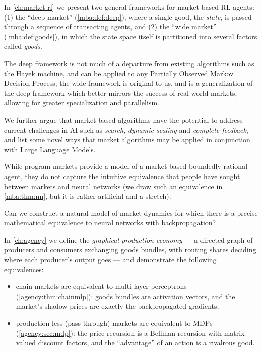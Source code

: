 \begin{contribution}
In \cref{ch:market-rl} we present two general frameworks for market-based RL agents: (1) the ``deep market'' (\cref{mba:def:deep}), where a single good, the \emph{state}, is passed through a sequence of transacting agents, and (2) the ``wide market'' (\cref{mba:def:goods}), in which the state space itself is partitioned into several factors called \emph{goods}. 

The deep framework is not much of a departure from existing algorithms such as the Hayek machine, and can be applied to any Partially Observed Markov Decision Process; the wide framework is original to us, and is a generalization of the deep framework which better mirrors the success of real-world markets, allowing for greater specialization and parallelism.

We further argue that market-based algorithms have the potential to address current challenges in AI such as \emph{search}, \emph{dynamic scaling} and \emph{complete feedback}, and list some novel ways that market algorithms may be applied in conjunction with Large Language Models.
\end{contribution}

While program markets provide a model of a market-based boundedly-rational agent, they do not capture the intuitive equivalence that people have sought between markets and neural networks (we draw such an equivalence in \cref{mba:thm:nn}, but it is rather artificial and a stretch).

\begin{researchquestion}\label{rq:backprop}
Can we construct a natural model of market dynamics for which there is a precise mathematical equivalence to neural networks with backpropagation?
\end{researchquestion}

\begin{contribution}
In \cref{ch:agency} we define the \emph{graphical production economy} --- a directed graph of producers and consumers exchanging goods bundles, with routing shares deciding where each producer's output goes --- and demonstrate the following equivalences:
\begin{itemize}
  \item chain markets are equivalent to multi-layer perceptrons (\cref{agency:thm:chainmlp}): goods bundles are activation vectors, and the market's shadow prices are exactly the backpropagated gradients;
  \item production-less (pass-through) markets are equivalent to MDPs (\cref{agency:sec:mdp}): the price recursion is a Bellman recursion with matrix-valued discount factors, and the ``advantage'' of an action is a rivalrous good.
\end{itemize}
\end{contribution}

